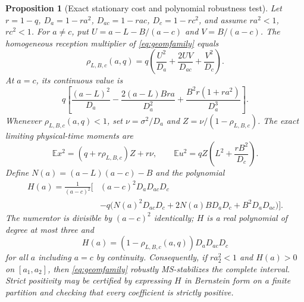 \documentclass[preprint,12pt,numbers]{elsarticle}
\newtheorem{proposition}{Proposition}
\theoremstyle{definition}
\begin{document}
\begin{proposition}[Exact stationary cost and polynomial robustness test]\label{prop:geomcost}
Let $r=1-q$, $D_a=1-ra^2$, $D_{ac}=1-rac$, $D_c=1-rc^2$, and assume $ra^2<1$, $rc^2<1$. For $a\ne c$, put $U=a-L-B/(a-c)$ and $V=B/(a-c)$. The homogeneous reception multiplier of \eqref{eq:geomfamily} equals
\begin{equation}\label{eq:geomrho}
\rho_{L,B,c}(a,q)=q\left(\frac{U^2}{D_a}+\frac{2UV}{D_{ac}}+\frac{V^2}{D_c}\right).
\end{equation}
At $a=c$, its continuous value is
\begin{equation}\label{eq:geomcenter}
q\left[\frac{(a-L)^2}{D_a}-\frac{2(a-L)Bra}{D_a^2}+\frac{B^2r(1+ra^2)}{D_a^3}\right].
\end{equation}
Whenever $\rho_{L,B,c}(a,q)<1$, set $\nu=\sigma^2/D_a$ and $Z=\nu/(1-\rho_{L,B,c})$. The exact limiting physical-time moments are
\begin{equation}\label{eq:geomcost}
\mathbb Ex^2=(q+r\rho_{L,B,c})Z+r\nu,\qquad
\mathbb Eu^2=qZ\left(L^2+\frac{rB^2}{D_c}\right).
\end{equation}
Define $N(a)=(a-L)(a-c)-B$ and the polynomial
\begin{align}\label{eq:Hpoly}
H(a)=\frac{1}{(a-c)^2}\bigl[&(a-c)^2D_aD_{ac}D_c\\[-2mm]
&-q\bigl(N(a)^2D_{ac}D_c+2N(a)BD_aD_c+B^2D_aD_{ac}\bigr)\bigr].\nonumber
\end{align}
The numerator is divisible by $(a-c)^2$ identically; $H$ is a real polynomial of degree at most three and
\begin{equation}\label{eq:Hidentity}H(a)=(1-\rho_{L,B,c}(a,q))D_aD_{ac}D_c\end{equation}
for all $a$ including $a=c$ by continuity. Consequently, if $ra_2^2<1$ and $H(a)>0$ on $[a_1,a_2]$, then \eqref{eq:geomfamily} robustly MS-stabilizes the complete interval. Strict positivity may be certified by expressing $H$ in Bernstein form on a finite partition and checking that every coefficient is strictly positive.
\end{proposition}
\end{document}

